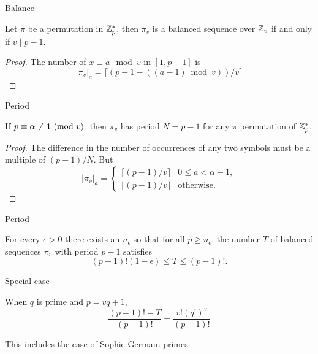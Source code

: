 
    \begin{frame}{Balance}

\begin{proposition} \label{balancedproperty}
Let $\pi$ be a permutation in $\mathbb{Z}_p^*$, then $\pi_v$ is a balanced 
sequence over $\mathbb{Z}_v$ if and only if $v \mid p-1$.
\end{proposition}
\begin{proof}
  
      The number of $x \equiv a \mod v$ in $[1,p-1]$ is
      \[  |\pi_v|_a = \lceil (p-1 - ((a-1) \bmod v))/v\rceil\]

  \end{proof}
      \end{frame}


      \begin{frame}{Period}

        \begin{lemma} \label{lemma_near_balanced_period}
If $p \equiv \alpha \neq 1 \ (\mathrm{mod}\ v)$, then $\pi_v$ has period $N =p-1$ for any $\pi$ permutation of $\mathbb{Z}_p^*$.
\end{lemma}
\begin{proof}

  The difference in the number of occurrences of any two symbols must be a multiple of $(p-1)/N$. But   
  \[
    |\pi_v|_a = \begin{cases} \lceil (p-1)/v \rceil &  0 \leq a < \alpha -1, \\
      \lfloor (p-1)/v \rfloor & \mbox{otherwise}.
    \end{cases}
  \]
\end{proof}

\end{frame}

\begin{frame}{Period}


\begin{theorem}For every $\epsilon >0 $ there exists an $n_{\epsilon}$ so that for 
  all $p \geq n_{\epsilon}$, the number $T$ of balanced sequences $\pi_v$ with period 
  $p-1$ satisfies 
  \begin{equation} \label{T_bound_epsilon}
    (p-1)!(1-\epsilon) \leq T \leq (p-1)!.
  \end{equation}
\end{theorem}
  
\end{frame}


\begin{frame}{Special case}

  When $q$ is prime and $p=vq+1$,
  \[
    \frac{(p-1)! - T}{(p-1)!} = \frac{v!(q!)^v}{(p-1)!} 
    \]

    This includes the case of Sophie Germain primes.
  
  \end{frame}

